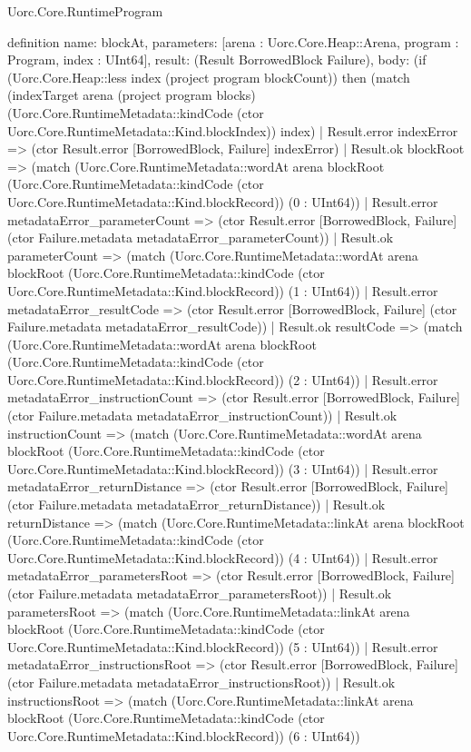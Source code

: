 \begin{lexlean}{Uorc.Core.RuntimeProgram}
\begin{semanticmodule}
definition{
  name: blockAt,
  parameters: [arena : Uorc.Core.Heap::Arena, program : Program, index : UInt64],
  result: (Result BorrowedBlock Failure),
  body: (if (Uorc.Core.Heap::less index (project program blockCount)) then (match (indexTarget arena (project program blocks) (Uorc.Core.RuntimeMetadata::kindCode (ctor Uorc.Core.RuntimeMetadata::Kind.blockIndex)) index)
    | Result.error indexError => (ctor Result.error [BorrowedBlock, Failure] indexError)
    | Result.ok blockRoot => (match (Uorc.Core.RuntimeMetadata::wordAt arena blockRoot (Uorc.Core.RuntimeMetadata::kindCode (ctor Uorc.Core.RuntimeMetadata::Kind.blockRecord)) (0 : UInt64))
      | Result.error metadataError_parameterCount => (ctor Result.error [BorrowedBlock, Failure] (ctor Failure.metadata metadataError_parameterCount))
      | Result.ok parameterCount => (match (Uorc.Core.RuntimeMetadata::wordAt arena blockRoot (Uorc.Core.RuntimeMetadata::kindCode (ctor Uorc.Core.RuntimeMetadata::Kind.blockRecord)) (1 : UInt64))
        | Result.error metadataError_resultCode => (ctor Result.error [BorrowedBlock, Failure] (ctor Failure.metadata metadataError_resultCode))
        | Result.ok resultCode => (match (Uorc.Core.RuntimeMetadata::wordAt arena blockRoot (Uorc.Core.RuntimeMetadata::kindCode (ctor Uorc.Core.RuntimeMetadata::Kind.blockRecord)) (2 : UInt64))
          | Result.error metadataError_instructionCount => (ctor Result.error [BorrowedBlock, Failure] (ctor Failure.metadata metadataError_instructionCount))
          | Result.ok instructionCount => (match (Uorc.Core.RuntimeMetadata::wordAt arena blockRoot (Uorc.Core.RuntimeMetadata::kindCode (ctor Uorc.Core.RuntimeMetadata::Kind.blockRecord)) (3 : UInt64))
            | Result.error metadataError_returnDistance => (ctor Result.error [BorrowedBlock, Failure] (ctor Failure.metadata metadataError_returnDistance))
            | Result.ok returnDistance => (match (Uorc.Core.RuntimeMetadata::linkAt arena blockRoot (Uorc.Core.RuntimeMetadata::kindCode (ctor Uorc.Core.RuntimeMetadata::Kind.blockRecord)) (4 : UInt64))
              | Result.error metadataError_parametersRoot => (ctor Result.error [BorrowedBlock, Failure] (ctor Failure.metadata metadataError_parametersRoot))
              | Result.ok parametersRoot => (match (Uorc.Core.RuntimeMetadata::linkAt arena blockRoot (Uorc.Core.RuntimeMetadata::kindCode (ctor Uorc.Core.RuntimeMetadata::Kind.blockRecord)) (5 : UInt64))
                | Result.error metadataError_instructionsRoot => (ctor Result.error [BorrowedBlock, Failure] (ctor Failure.metadata metadataError_instructionsRoot))
                | Result.ok instructionsRoot => (match (Uorc.Core.RuntimeMetadata::linkAt arena blockRoot (Uorc.Core.RuntimeMetadata::kindCode (ctor Uorc.Core.RuntimeMetadata::Kind.blockRecord)) (6 : UInt64))
}
\end{semanticmodule}
\end{lexlean}
